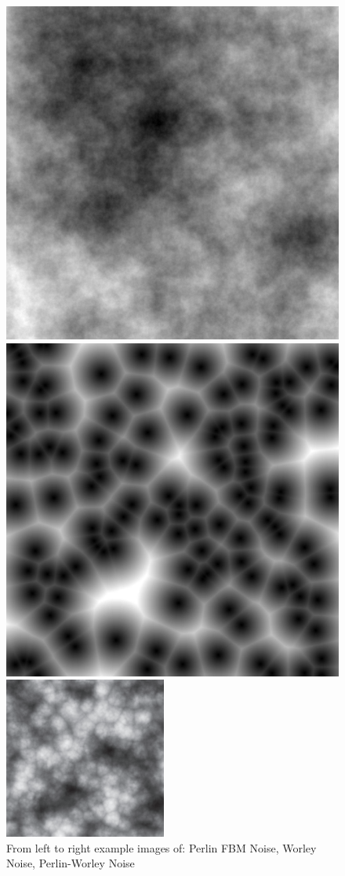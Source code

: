 \documentclass[10pt, openany]{book}
\begin{document}
\begin{figure}[H]
\centering
\begin{minipage}{.3\textwidth}
  \centering
  \includegraphics[width=.6\linewidth]{fbm}
\end{minipage}%
\begin{minipage}{.3\textwidth}
  \centering
  \includegraphics[width=.6\linewidth]{worley}
\end{minipage}%
\begin{minipage}{.3\textwidth}
  \centering
  \includegraphics[width=.6\linewidth]{perlin-worley}
\end{minipage}
\caption{From left to right example images of: Perlin FBM Noise, Worley Noise, Perlin-Worley Noise}
\end{figure}	
\end{document}
